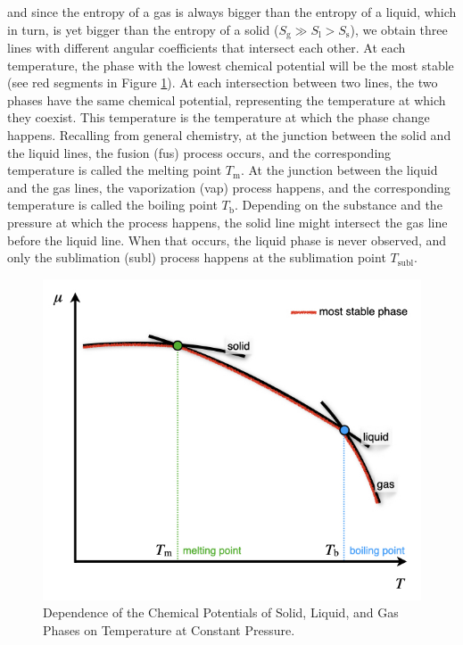 \documentclass[
  9pt,
]{extbook}
\theoremstyle{definition}
\theoremstyle{definition}
\theoremstyle{definition}
\theoremstyle{remark}
\begin{document}
and since the entropy of a gas is always bigger than the entropy of a liquid, which in turn, is yet bigger than the entropy of a solid (\(S_{\text{g}} \gg S_{\text{l}}>S_{\text{s}}\)), we obtain three lines with different angular coefficients that intersect each other. At each temperature, the phase with the lowest chemical potential will be the most stable (see red segments in Figure \ref{fig:FigPhase1}). At each intersection between two lines, the two phases have the same chemical potential, representing the temperature at which they coexist. This temperature is the temperature at which the phase change happens. Recalling from general chemistry, at the junction between the solid and the liquid lines, the fusion (fus) process occurs, and the corresponding temperature is called the melting point \(T_{\text{m}}\). At the junction between the liquid and the gas lines, the vaporization (vap) process happens, and the corresponding temperature is called the boiling point \(T_{\text{b}}\). Depending on the substance and the pressure at which the process happens, the solid line might intersect the gas line before the liquid line. When that occurs, the liquid phase is never observed, and only the sublimation (subl) process happens at the sublimation point \(T_{\text{subl}}\).

\begin{figure}

{\centering \includegraphics[width=0.6\linewidth]{./img/OEP_Figures.016} 

}

\caption{Dependence of the Chemical Potentials of Solid, Liquid, and Gas Phases on Temperature at Constant Pressure.}\label{fig:FigPhase1}
\end{figure}
\end{document}
